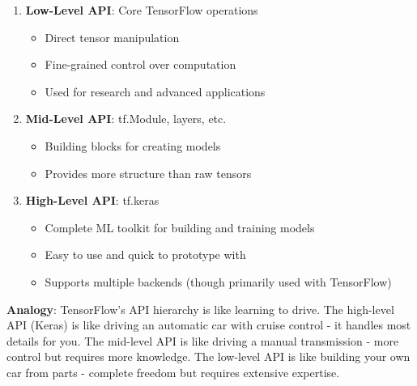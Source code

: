 \documentclass[
  letterpaper,
  DIV=11,
  numbers=noendperiod]{scrreprt}
\providecommand{\tightlist}{%
  \setlength{\itemsep}{0pt}\setlength{\parskip}{0pt}}\usepackage{longtable,booktabs,array}
\begin{document}
\begin{enumerate}
\def\labelenumi{\arabic{enumi}.}
\tightlist
\item
  \textbf{Low-Level API}: Core TensorFlow operations

  \begin{itemize}
  \tightlist
  \item
    Direct tensor manipulation
  \item
    Fine-grained control over computation
  \item
    Used for research and advanced applications
  \end{itemize}
\item
  \textbf{Mid-Level API}: tf.Module, layers, etc.

  \begin{itemize}
  \tightlist
  \item
    Building blocks for creating models
  \item
    Provides more structure than raw tensors
  \end{itemize}
\item
  \textbf{High-Level API}: tf.keras

  \begin{itemize}
  \tightlist
  \item
    Complete ML toolkit for building and training models
  \item
    Easy to use and quick to prototype with
  \item
    Supports multiple backends (though primarily used with TensorFlow)
  \end{itemize}
\end{enumerate}

\textbf{Analogy}: TensorFlow's API hierarchy is like learning to drive.
The high-level API (Keras) is like driving an automatic car with cruise
control - it handles most details for you. The mid-level API is like
driving a manual transmission - more control but requires more
knowledge. The low-level API is like building your own car from parts -
complete freedom but requires extensive expertise.
\end{document}
